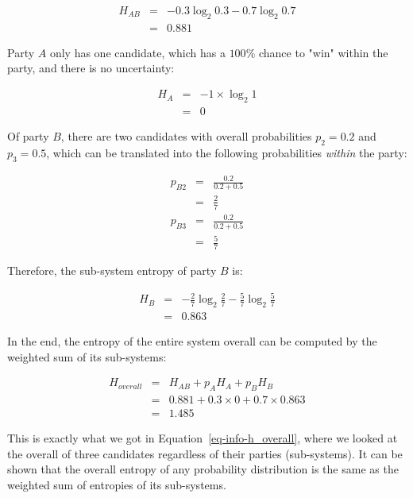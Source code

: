 \documentclass[
  letterpaper,
]{scrbook}
\begin{document}
\[\begin{aligned}
  H_{AB}
  & = & -0.3 \log_2 0.3 - 0.7 \log_2 0.7 \\
  & = & 0.881
\end{aligned}\]

Party \(A\) only has one candidate, which has a \(100\%\) chance to
"win" within the party, and there is no uncertainty:

\[\begin{aligned}
  H_A
  & = & - 1 \times \log_2 1 \\
  & = & 0
\end{aligned}\]

Of party \(B\), there are two candidates with overall probabilities
\(p_2 = 0.2\) and \(p_3=0.5\), which can be translated into the
following probabilities \emph{within} the party:

\[\begin{aligned}
  p_{B2} & = & \frac{0.2}{0.2+0.5} \\
      & = & \frac{2}{7} \\
  p_{B3} & = & \frac{0.2}{0.2+0.5} \\
      & = & \frac{5}{7}
\end{aligned}\]

Therefore, the sub-system entropy of party \(B\) is:

\[\begin{aligned}
  H_B
  & = & - \frac{2}{7} \log_2 \frac{2}{7} - \frac{5}{7} \log_2 \frac{5}{7} \\
  & = & 0.863
\end{aligned}\]

In the end, the entropy of the entire system overall can be computed by
the weighted sum of its sub-systems:

\[\begin{aligned}
  H_{overall}
  & = & H_{AB} + p_A H_A + p_B H_B \\
  & = & 0.881 + 0.3 \times 0 + 0.7 \times 0.863 \\
  & = & 1.485
\end{aligned}\]

This is exactly what we got in
Equation~\hyperref[eq-info-h_overall]{{[}eq-info-h\_overall{]}}, where
we looked at the overall of three candidates regardless of their parties
(sub-systems). It can be shown that the overall entropy of any
probability distribution is the same as the weighted sum of entropies of
its sub-systems.
\end{document}
